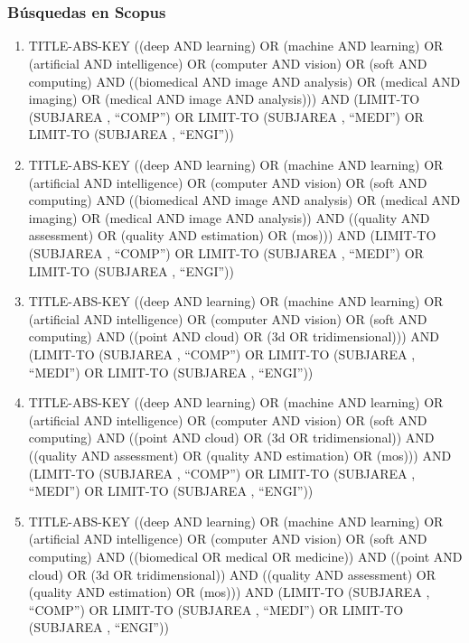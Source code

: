 \chapter*{}
\subsection*{Búsquedas en Scopus}
\begin{enumerate}
 \item 
 TITLE-ABS-KEY ((deep AND learning) OR (machine AND learning) 
 OR (artificial AND intelligence) OR (computer AND vision) 
 OR (soft AND computing) AND ((biomedical AND image AND analysis) 
 OR (medical AND imaging) OR (medical AND image AND analysis))) 
 AND (LIMIT-TO (SUBJAREA , ``COMP'') OR LIMIT-TO (SUBJAREA , ``MEDI'') 
 OR LIMIT-TO (SUBJAREA , ``ENGI''))
 \item 
 TITLE-ABS-KEY ((deep AND learning) OR (machine AND learning) OR (artificial AND intelligence) OR (computer AND vision) OR (soft AND computing) AND ((biomedical AND image AND analysis) OR (medical AND imaging) OR (medical AND image AND analysis)) AND ((quality AND assessment) OR (quality AND estimation) OR (mos))) AND (LIMIT-TO (SUBJAREA , ``COMP'') OR LIMIT-TO (SUBJAREA , ``MEDI'') OR LIMIT-TO (SUBJAREA , ``ENGI'')) 
 \item 
 TITLE-ABS-KEY ((deep AND learning) OR (machine AND learning) OR (artificial AND intelligence) OR (computer AND vision) OR (soft AND computing) AND ((point AND cloud) OR (3d OR tridimensional))) AND (LIMIT-TO (SUBJAREA , ``COMP'') OR LIMIT-TO (SUBJAREA , ``MEDI'') OR LIMIT-TO (SUBJAREA , ``ENGI''))
 \item 
 TITLE-ABS-KEY ((deep AND learning) OR (machine AND learning) OR (artificial AND intelligence) OR (computer AND vision) OR (soft AND computing) AND ((point AND cloud) OR (3d OR tridimensional)) AND ((quality AND assessment) OR (quality AND estimation) OR (mos))) AND (LIMIT-TO (SUBJAREA , ``COMP'') OR LIMIT-TO (SUBJAREA , ``MEDI'') OR LIMIT-TO (SUBJAREA , ``ENGI''))
 \item 
 TITLE-ABS-KEY ((deep AND learning) OR (machine AND learning) OR (artificial AND intelligence) OR (computer AND vision) OR (soft AND computing) AND ((biomedical OR medical OR medicine)) AND ((point AND cloud) OR (3d OR tridimensional)) AND ((quality AND assessment) OR (quality AND estimation) OR (mos))) AND (LIMIT-TO (SUBJAREA , ``COMP'') OR LIMIT-TO (SUBJAREA , ``MEDI'') OR LIMIT-TO (SUBJAREA , ``ENGI''))
\end{enumerate}
